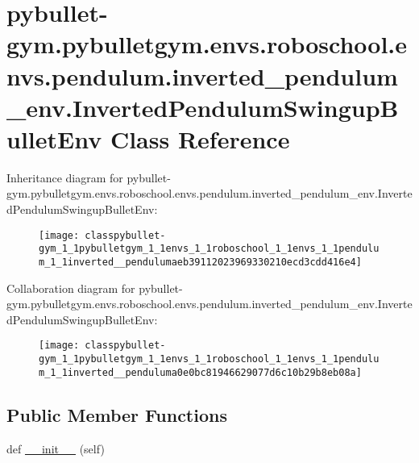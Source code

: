 \hypertarget{classpybullet-gym_1_1pybulletgym_1_1envs_1_1roboschool_1_1envs_1_1pendulum_1_1inverted__pendulum31fc9ccf12e9f4ec80aa8e0d61d78e8e}{}\section{pybullet-\/gym.pybulletgym.\+envs.\+roboschool.\+envs.\+pendulum.\+inverted\+\_\+pendulum\+\_\+env.\+Inverted\+Pendulum\+Swingup\+Bullet\+Env Class Reference}
\label{classpybullet-gym_1_1pybulletgym_1_1envs_1_1roboschool_1_1envs_1_1pendulum_1_1inverted__pendulum31fc9ccf12e9f4ec80aa8e0d61d78e8e}


Inheritance diagram for pybullet-\/gym.pybulletgym.\+envs.\+roboschool.\+envs.\+pendulum.\+inverted\+\_\+pendulum\+\_\+env.\+Inverted\+Pendulum\+Swingup\+Bullet\+Env\+:
\nopagebreak
\begin{figure}[H]
\begin{center}
\leavevmode
\texttt{[image: classpybullet-gym\_1\_1pybulletgym\_1\_1envs\_1\_1roboschool\_1\_1envs\_1\_1pendulum\_1\_1inverted\_\_pendulumaeb39112023969330210ecd3cdd416e4]}
\end{center}
\end{figure}


Collaboration diagram for pybullet-\/gym.pybulletgym.\+envs.\+roboschool.\+envs.\+pendulum.\+inverted\+\_\+pendulum\+\_\+env.\+Inverted\+Pendulum\+Swingup\+Bullet\+Env\+:
\nopagebreak
\begin{figure}[H]
\begin{center}
\leavevmode
\texttt{[image: classpybullet-gym\_1\_1pybulletgym\_1\_1envs\_1\_1roboschool\_1\_1envs\_1\_1pendulum\_1\_1inverted\_\_penduluma0e0bc81946629077d6c10b29b8eb08a]}
\end{center}
\end{figure}
\subsection*{Public Member Functions}
\begin{DoxyCompactItemize}
\item 
def \hyperlink{classpybullet-gym_1_1pybulletgym_1_1envs_1_1roboschool_1_1envs_1_1pendulum_1_1inverted__pendulum31fc9ccf12e9f4ec80aa8e0d61d78e8e_a13f1ed1893d963bbca8371f59344f9e9}{\+\_\+\+\_\+init\+\_\+\+\_\+} (self)
\end{DoxyCompactItemize}
